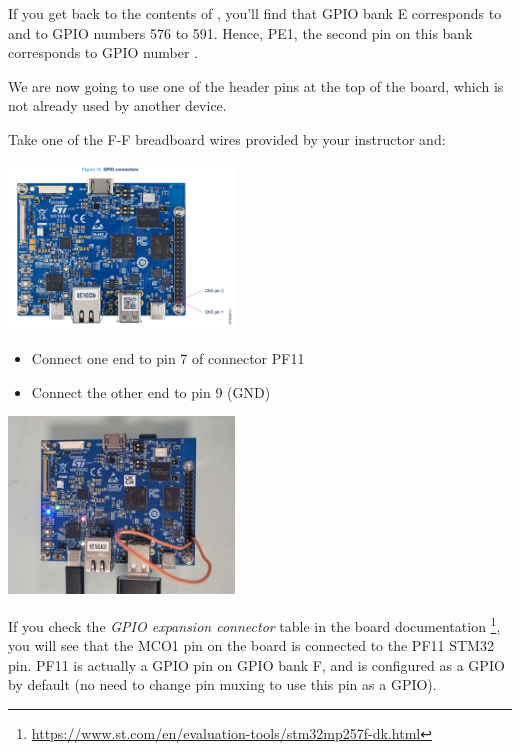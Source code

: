       If you get back to the contents of , you'll
      find that GPIO bank E corresponds to  and to GPIO
      numbers 576 to 591. Hence, PE1, the second pin on this bank corresponds to
      GPIO number \gpionum.
\fi

\if{}
      We are now going to use one of the header pins at the top
      of the board, which is not already used by another device.

      Take one of the F-F breadboard wires provided by your instructor and:

      \begin{center}
            \includegraphics[width=6cm]{labs/sysdev-accessing-hardware-stm32/stm32mp2_pin_map.png}
      \end{center}
      
      \begin{itemize}
      \item Connect one end to pin 7 of connector PF11
      \item Connect the other end to pin 9 (GND) 
      \end{itemize}


      \begin{center}
            \includegraphics[width=6cm]{labs/sysdev-accessing-hardware-stm32/stm32mp2_gpio_to_gnd.jpg}
      \end{center}
      

      If you check the {\em GPIO expansion connector} table in the board
      documentation
      \footnote{\url{https://www.st.com/en/evaluation-tools/stm32mp257f-dk.html}},
      you will see that the MCO1 pin on the board is connected to the PF11
      STM32 pin. PF11 is actually a GPIO pin on GPIO bank F, and is configured
      as a GPIO by default (no need to change pin muxing to use this pin as
      a GPIO).

